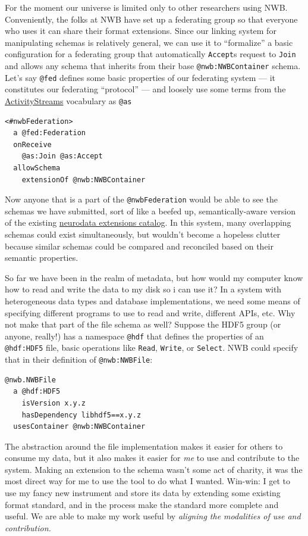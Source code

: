 \documentclass[10pt]{tufte-book}
\begin{document}
For the moment our universe is limited only to other researchers using
NWB. Conveniently, the folks at NWB have set up a federating group so
that everyone who uses it can share their format extensions. Since our
linking system for manipulating schemas is relatively general, we can
use it to ``formalize'' a basic configuration for a federating group
that automatically \texttt{Accept}s request to \texttt{Join} and allows
any schema that inherits from their base \texttt{@nwb:NWBContainer}
schema. Let's say \texttt{@fed} defines some basic properties of our
federating system --- it constitutes our federating ``protocol'' --- and
loosely use some terms from the
\href{https://www.w3.org/ns/activitystreams\#class-definitions}{ActivityStreams}
vocabulary as \texttt{@as}

\begin{verbatim}
<#nwbFederation>
  a @fed:Federation
  onReceive
    @as:Join @as:Accept
  allowSchema
    extensionOf @nwb:NWBContainer
\end{verbatim}

Now anyone that is a part of the \texttt{@nwbFederation} would be able
to see the schemas we have submitted, sort of like a beefed up,
semantically-aware version of the existing
\href{https://nwb-extensions.github.io/}{neurodata extensions catalog}.
In this system, many overlapping schemas could exist simultaneously, but
wouldn't become a hopeless clutter because similar schemas could be
compared and reconciled based on their semantic properties.

So far we have been in the realm of metadata, but how would my computer
know how to read and write the data to my disk so i can use it? In a
system with heterogeneous data types and database implementations, we
need some means of specifying different programs to use to read and
write, different APIs, etc. Why not make that part of the file schema as
well? Suppose the HDF5 group (or anyone, really!) has a namespace
\texttt{@hdf} that defines the properties of an \texttt{@hdf:HDF5} file,
basic operations like \texttt{Read}, \texttt{Write}, or \texttt{Select}.
NWB could specify that in their definition of \texttt{@nwb:NWBFile}:

\begin{verbatim}
@nwb.NWBFile
  a @hdf:HDF5
    isVersion x.y.z
    hasDependency libhdf5==x.y.z
  usesContainer @nwb:NWBContainer
\end{verbatim}

The abstraction around the file implementation makes it easier for
others to consume my data, but it also makes it easier for \emph{me} to
use and contribute to the system. Making an extension to the schema
wasn't some act of charity, it was the most direct way for me to use the
tool to do what I wanted. Win-win: I get to use my fancy new instrument
and store its data by extending some existing format standard, and in
the process make the standard more complete and useful. We are able to
make my work useful by \emph{aligning the modalities of use and
contribution.}
\end{document}
